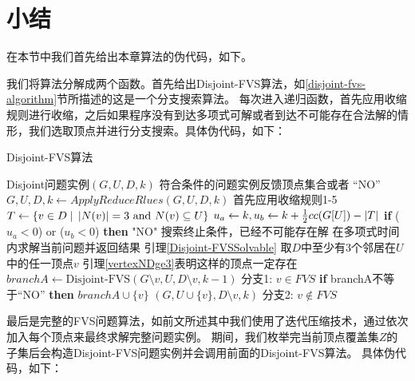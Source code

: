 \section{小结}

在本节中我们首先给出本章算法的伪代码，如下。

我们将算法分解成两个函数。首先给出Disjoint-FVS算法，如\ref{disjoint-fvs-algorithm}节所描述的这是一个分支搜索算法。
每次进入递归函数，首先应用收缩规则进行收缩，之后如果程序没有到达多项式可解或者到达不可能存在合法解的情形，我们选取顶点并进行分支搜索。具体伪代码，如下：\\

\begin{algorithm}
\caption{Disjoint-FVS算法}
\begin{algorithmic}[1]
\Require Disjoint问题实例$(G,U, D, k)$
\Ensure  符合条件的问题实例反馈顶点集合或者 “NO”
\algrule
{}
    \State $G, U, D, k \gets ApplyReduceRlues(G, U, D, k)$ \Comment 首先应用收缩规则1-5
    \State $T \gets \{v \in D\;|\;\left\vert N(v) \right\vert = 3 \text{ and } N(v) \subseteq U\}$
    \State $u_a \gets k, u_b \gets k + \frac{1}{2}cc(G[U]) - \left\vert T \right\vert$
    \State \textbf{if} ($u_a < 0$) or ($u_b < 0$) \textbf{then} \Return "NO" \Comment 搜索终止条件，已经不可能存在解
        \State 在多项式时间内求解当前问题并返回结果 \Comment 引理\ref{Disjoint-FVSSolvable}
    \Else
        \State 取$D$中至少有3个邻居在$U$中的任一顶点$v$
        \State \Comment 引理\ref{vertexNDge3}表明这样的顶点一定存在
        \State $branchA \gets \text{Disjoint-FVS}(G \setminus v, U, D \setminus v, k - 1)$
        \Comment 分支1: $v \in FVS$
        \State \textbf{if} branchA不等于“NO” \textbf{then} \Return $branchA \cup \{v\}$
        \State \Return {}$(G, U\cup\{v\}, D \setminus v, k)$
        \Comment 分支2: $v \notin FVS$
    \EndIf
\EndFunction
\end{algorithmic}
\end{algorithm}

\newpage
最后是完整的FVS问题算法，如前文所述其中我们使用了迭代压缩技术，通过依次加入每个顶点来最终求解完整问题实例。
期间，我们枚举完当前顶点覆盖集$Z$的子集后会构造Disjoint-FVS问题实例并会调用前面的Disjoint-FVS算法。
具体伪代码，如下：\\

